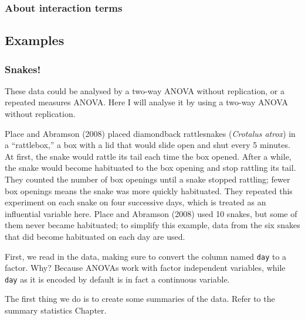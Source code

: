 \documentclass[english,10pt,a4paper,oneside]{book}
\newenvironment{Shaded}{\begin{snugshade}}{\end{snugshade}}
\newcommand{\KeywordTok}[1]{\textcolor[rgb]{0.13,0.29,0.53}{\textbf{#1}}}
\newcommand{\StringTok}[1]{\textcolor[rgb]{0.31,0.60,0.02}{#1}}
\newcommand{\OperatorTok}[1]{\textcolor[rgb]{0.81,0.36,0.00}{\textbf{#1}}}
\newcommand{\NormalTok}[1]{#1}
\theoremstyle{definition}
\theoremstyle{definition}
\theoremstyle{definition}
\theoremstyle{remark}
\begin{document}
\subsubsection{About interaction terms}\label{about-interaction-terms}

\subsection{Examples}\label{examples}

\subsubsection{Snakes!}\label{snakes}

These data could be analysed by a two-way ANOVA without replication, or
a repeated measures ANOVA. Here I will analyse it by using a two-way
ANOVA without replication.

Place and Abramson (2008) placed diamondback rattlesnakes
(\emph{Crotalus atrox}) in a \enquote{rattlebox,} a box with a lid that
would slide open and shut every 5 minutes. At first, the snake would
rattle its tail each time the box opened. After a while, the snake would
become habituated to the box opening and stop rattling its tail. They
counted the number of box openings until a snake stopped rattling; fewer
box openings means the snake was more quickly habituated. They repeated
this experiment on each snake on four successive days, which is treated
as an influential variable here. Place and Abramson (2008) used 10
snakes, but some of them never became habituated; to simplify this
example, data from the six snakes that did become habituated on each day
are used.

First, we read in the data, making sure to convert the column named
\texttt{day} to a factor. Why? Because ANOVAs work with factor
independent variables, while \texttt{day} as it is encoded by default is
in fact a continuous variable.

\begin{Shaded}
\end{Shaded}

The first thing we do is to create some summaries of the data. Refer to
the summary statistics Chapter.
\end{document}
